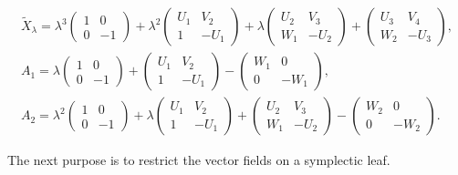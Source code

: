 \documentclass[10pt,a4paper]{amsart}
\numberwithin{equation}{section}
\begin{document}
\begin{gather*}
\widetilde{X}_\lambda = \lambda ^3 \left(
\begin{matrix}
1 & 0 \\
0 & -1
\end{matrix}
\right) + \lambda^2 \left(
\begin{matrix}
U_1 & V_2 \\
1 & -U_1
\end{matrix}
\right) + \lambda \left(
\begin{matrix}
U_2 & V_3 \\
W_1 & -U_2
\end{matrix}
\right) + \left(
\begin{matrix}
U_3 & V_4 \\
W_2 & -U_3
\end{matrix}
\right), \\
A_1 = \lambda \left(
\begin{matrix}
1 & 0 \\
0 & -1
\end{matrix}
\right) + \left(
\begin{matrix}
U_1 & V_2 \\
1 & -U_1
\end{matrix}
\right) - \left(
\begin{matrix}
W_1 & 0 \\
0 & -W_1
\end{matrix}
\right), \\
A_2 = \lambda^2 \left(
\begin{matrix}
1 & 0 \\
0 & -1
\end{matrix}
\right) + \lambda \left(
\begin{matrix}
U_1 & V_2 \\
1 & -U_1
\end{matrix}
\right) + \left(
\begin{matrix}
U_2 & V_3 \\
W_1 & -U_2
\end{matrix}
\right)
 - \left(
\begin{matrix}
W_2 & 0 \\
0 & -W_2
\end{matrix}
\right).
\end{gather*}

The next purpose is to restrict the vector f\/ields on a symplectic leaf.
\end{document}
